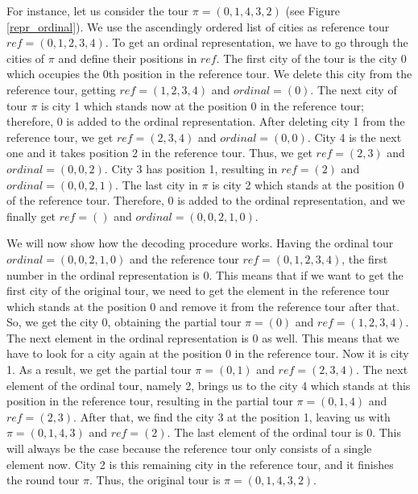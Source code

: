 For instance, let us consider the tour $\pi = (0, 1, 4, 3, 2)$ (see Figure \ref{repr_ordinal}). We use the ascendingly ordered list of cities as reference tour $ref=(0, 1, 2, 3, 4)$. To get an ordinal representation, we have to go through the cities of $\pi$ and define their positions in $ref$. The first city of the tour is the city $0$ which occupies the 0th position in the reference tour. We delete this city from the reference tour, getting $ref=(1, 2, 3, 4)$ and $ordinal = (0)$. The next city of tour $\pi$ is city 1 which stands now at the position 0 in the reference tour; therefore, 0 is added to the ordinal representation. After deleting city 1 from the reference tour, we get $ref=(2, 3, 4)$ and $ordinal = (0, 0)$. City 4 is the next one and it takes position 2 in the reference tour. Thus, we get $ref=(2, 3)$ and $ordinal = (0, 0, 2)$. City 3 has position 1, resulting in $ref=(2)$ and $ordinal = (0, 0, 2, 1)$. The last city in $\pi$ is city 2 which stands at the position 0 of the reference tour. Therefore, 0 is added to the ordinal representation, and we finally get $ref=()$ and $ordinal = (0, 0, 2, 1, 0)$. \par 

We will now show how the decoding procedure works. Having the ordinal tour  $ordinal = (0, 0, 2, 1, 0)$ and the reference tour $ref=(0, 1, 2, 3, 4)$, the first number in the ordinal representation is 0. This means that if we want to get the first city of the original tour, we need to get the element in the reference tour which stands at the position 0 and remove it from the reference tour after that. So, we get the city 0, obtaining the partial tour $\pi = (0)$ and $ref=(1, 2, 3, 4)$. The next element in the ordinal representation is 0 as well. This means that we have to look for a city again at the position 0 in the reference tour. Now it is city 1. As a result, we get the partial tour $\pi = (0, 1)$ and $ref=(2, 3, 4)$. The next element of the ordinal tour, namely 2, brings us to the city 4 which stands at this position in the reference tour, resulting in the partial tour $\pi = (0, 1, 4)$ and $ref=(2, 3)$. After that, we find the city 3 at the position 1, leaving us with $\pi = (0, 1, 4, 3)$ and $ref=(2)$. The last element of the ordinal tour is 0.  This will always be the case because the reference tour only consists of a single element now. City 2 is this remaining city in the reference tour, and it finishes the round tour $\pi$. Thus, the original tour is $\pi = (0, 1, 4, 3, 2)$.\\

